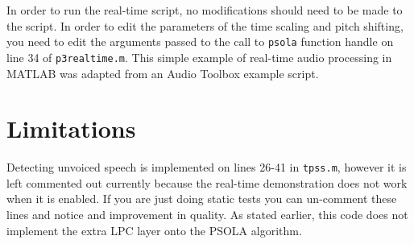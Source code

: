\documentclass[letterpaper]{article}
\begin{document}
In order to run the real-time script, no modifications should need to be made to the script. In order to edit the parameters of the time scaling and pitch shifting, you need to edit the arguments passed to the call to \texttt{psola} function handle on line 34 of \texttt{p3realtime.m}. This simple example of real-time audio processing in MATLAB was adapted from an Audio Toolbox example script. 

\section{Limitations}
Detecting unvoiced speech is implemented on lines 26-41 in \texttt{tpss.m}, however it is left commented out currently because the real-time demonstration does not work when it is enabled. If you are just doing static tests you can un-comment these lines and notice and improvement in quality. As stated earlier, this code does not implement the extra LPC layer onto the PSOLA algorithm.




\end{document}
